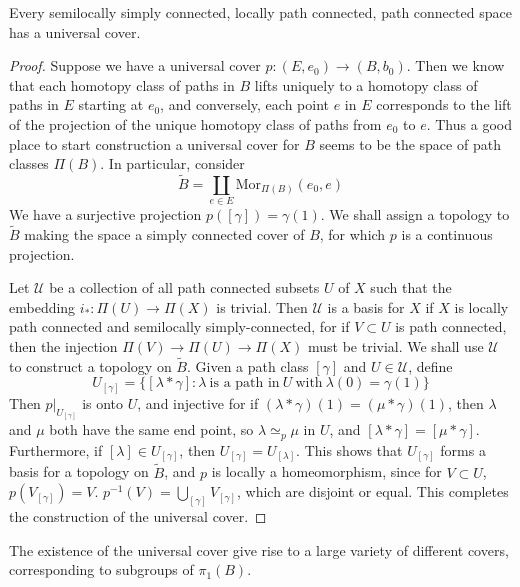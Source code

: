 \begin{theorem}
    Every semilocally simply connected, locally path connected, path connected space has a universal cover.
\end{theorem}
\begin{proof}
Suppose we have a universal cover $p: (E,e_0) \to (B,b_0)$. Then we know that each homotopy class of paths in $B$ lifts uniquely to a homotopy class of paths in $E$ starting at $e_0$, and conversely, each point $e$ in $E$ corresponds to the lift of the projection of the unique homotopy class of paths from $e_0$ to $e$. Thus a good place to start construction a universal cover for $B$ seems to be the space of path classes $\Pi(B)$. In particular, consider
%
\[ \tilde{B} = \coprod_{e \in E} \text{Mor}_{\Pi(B)}(e_0, e) \]
%
We have a surjective projection $p([\gamma]) = \gamma(1)$. We shall assign a topology to $\tilde{B}$ making the space a simply connected cover of $B$, for which $p$ is a continuous projection.

Let $\mathcal{U}$ be a collection of all path connected subsets $U$ of $X$ such that the embedding $i_*: \Pi(U) \to \Pi(X)$ is trivial. Then $\mathcal{U}$ is a basis for $X$ if $X$ is locally path connected and semilocally simply-connected, for if $V \subset U$ is path connected, then the injection $\Pi(V) \to \Pi(U) \to \Pi(X)$ must be trivial. We shall use $\mathcal{U}$ to construct a topology on $\tilde{B}$. Given a path class $[\gamma]$ and $U \in \mathcal{U}$, define
%
\[ U_{[\gamma]} = \{ [\lambda * \gamma] : \lambda\ \text{is a path in}\ U\ \text{with}\ \lambda(0) = \gamma(1) \} \]
%
Then $p|_{U_{[\gamma]}}$ is onto $U$, and injective for if $(\lambda * \gamma)(1) = (\mu * \gamma)(1)$, then $\lambda$ and $\mu$ both have the same end point, so $\lambda \simeq_p \mu$ in $U$, and $[\lambda * \gamma] = [\mu * \gamma]$. Furthermore, if $[\lambda] \in U_{[\gamma]}$, then $U_{[\gamma]} = U_{[\lambda]}$. This shows that $U_{[\gamma]}$ forms a basis for a topology on $\tilde{B}$, and $p$ is locally a homeomorphism, since for $V \subset U$, $p(V_{[\gamma]}) = V$. $p^{-1}(V) = \bigcup_{[\gamma]} V_{[\gamma]}$, which are disjoint or equal. This completes the construction of the universal cover.
\end{proof}

The existence of the universal cover give rise to a large variety of different covers, corresponding to subgroups of $\pi_1(B)$.

